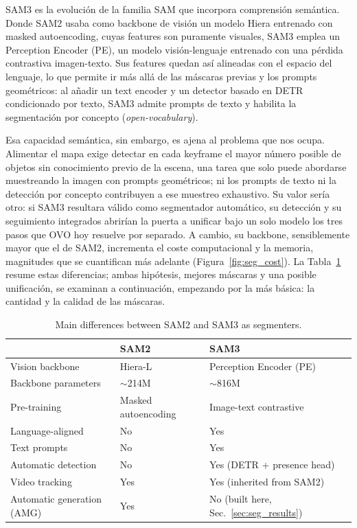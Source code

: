 SAM3 es la evolución de la familia SAM que incorpora comprensión semántica. Donde SAM2 usaba
como backbone de visión un modelo Hiera entrenado con masked autoencoding, cuyas features son
puramente visuales, SAM3 emplea un Perception Encoder (PE), un modelo visión-lenguaje entrenado
con una pérdida contrastiva imagen-texto. Sus features quedan así alineadas con el espacio del
lenguaje, lo que permite ir más allá de las máscaras previas y los prompts geométricos: al
añadir un text encoder y un detector basado en DETR condicionado por texto, SAM3 admite prompts
de texto y habilita la segmentación por concepto (\emph{open-vocabulary}).

Esa capacidad semántica, sin embargo, es ajena al problema que nos ocupa. Alimentar el mapa
exige detectar en cada keyframe el mayor número posible de objetos sin conocimiento previo de la
escena, una tarea que solo puede abordarse muestreando la imagen con prompts geométricos; ni los
prompts de texto ni la detección por concepto contribuyen a ese muestreo exhaustivo. Su valor
sería otro: si SAM3 resultara válido como segmentador automático, su detección y su seguimiento
integrados abrirían la puerta a unificar bajo un solo modelo los tres pasos que OVO hoy resuelve
por separado. A cambio, su backbone, sensiblemente mayor que el de SAM2, incrementa el coste
computacional y la memoria, magnitudes que se cuantifican más adelante (Figura~\ref{fig:seg_cost}). La
Tabla~\ref{tab:seg_sam2_vs_sam3} resume estas diferencias; ambas hipótesis, mejores máscaras y
una posible unificación, se examinan a continuación, empezando por la más básica: la cantidad y
la calidad de las máscaras.

\begin{table}[t]
  \centering
  \caption{Main differences between SAM2 and SAM3 as segmenters.}
  \label{tab:seg_sam2_vs_sam3}
  \begin{tabular}{lll}
    \toprule
     & \textbf{SAM2} & \textbf{SAM3} \\
    \midrule
    Vision backbone         & Hiera-L              & Perception Encoder (PE) \\
    Backbone parameters     & $\sim$214M           & $\sim$816M \\
    Pre-training            & Masked autoencoding  & Image-text contrastive \\
    Language-aligned        & No                   & Yes \\
    Text prompts            & No                   & Yes \\
    Automatic detection     & No                   & Yes (DETR + presence head) \\
    Video tracking          & Yes                  & Yes (inherited from SAM2) \\
    Automatic generation (AMG) & Yes               & No (built here, Sec.~\ref{sec:seg_results}) \\
    \bottomrule
  \end{tabular}
\end{table}

